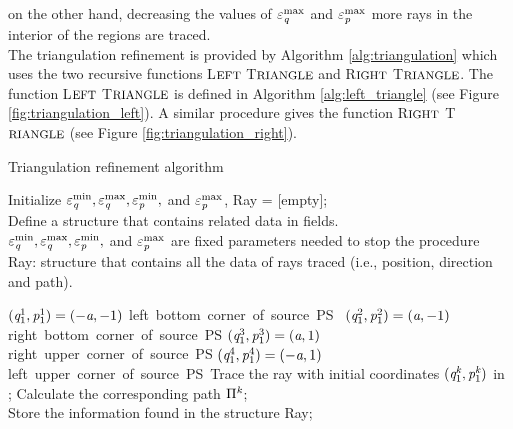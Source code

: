 on the other hand, decreasing the values of $\varepsilon_{\textit{q}}^\textrm{max}$ and $\varepsilon_{\textit{p}}^\textrm{max}$ more rays in the interior of the regions are traced. \\ \indent The triangulation refinement is provided by Algorithm \ref{alg:triangulation} which uses the two recursive functions L$\footnotesize{\textrm{EFT}}$ T$\footnotesize{\textrm{RIANGLE}}$ and  R$\footnotesize{\textrm{IGHT}}$ T$\footnotesize{\textrm{RIANGLE}}$.
The function L$\footnotesize{\textrm{EFT}}$ T$\footnotesize{\textrm{RIANGLE}}$ is defined in Algorithm \ref{alg:left_triangle} (see Figure \ref{fig:triangulation_left}). 
A similar procedure gives the function R$\footnotesize{\textrm{IGHT}}$ T$\footnotesize{\textrm{RIANGLE}}$ (see Figure \ref{fig:triangulation_right}).
\begin{algorithm}[h]
\caption{Triangulation refinement algorithm}\label{alg:triangulation}
Initialize $\varepsilon_{\textit{q}}^{\textrm{min}}, \varepsilon_{\textit{q}}^{\textrm{max}}, \varepsilon_{\textit{p}}^{\textrm{min}},$ and
 $\varepsilon_{\textit{p}}^{\textrm{max}}$, Ray = [empty];\\
Define a structure that contains related data in fields. \\
\Comment $\varepsilon_{\textit{q}}^{\textrm{min}}, \varepsilon_{\textit{q}}^{\textrm{max}}, \varepsilon_{\textit{p}}^{\textrm{min}},$ and
 $\varepsilon_{\textit{p}}^{\textrm{max}}$ are fixed parameters needed to stop the procedure\\
\Comment Ray: structure that contains all the data of rays traced (i.e., position, direction and path).
\begin{algorithmic}[1]
\State $(\textit{q}_1^1, \textit{p}_1^1)= (-\textit{a}, -1)$ \Comment \mbox{left bottom corner of source PS \;}
\State $(\textit{q}_1^2, \textit{p}_1^2) = (\textit{a}, -1)$ \Comment \mbox{right bottom corner of source PS}
\State $(\textit{q}_1^3, \textit{p}_1^3)  = (\textit{a}, 1)$ \Comment \mbox{right upper corner of source PS\;\;}
\State $(\textit{q}_1^4, \textit{p}_1^4) = (-\textit{a}, 1) $ \Comment \mbox{left upper corner of source PS\;\;\;\;\,}
\State Trace the ray with initial coordinates $(\textit{q}_1^{\textit{k}}, \textit{p}_1^{\textit{k}})$ in ;
\State Calculate the corresponding path $\Pi^{\textit{k}}$; $\qquad \qquad \qquad \qquad \qquad \qquad \qquad \qquad\quad$
\Comment Store the information found in the structure Ray;

\end{algorithmic}
\end{algorithm}
